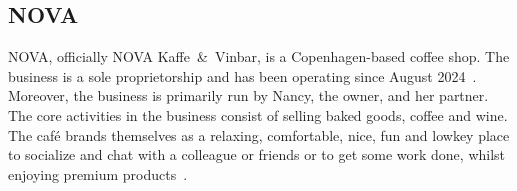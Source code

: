 \subsection{NOVA}\label{subsec:nova}

NOVA, officially NOVA Kaffe~\&~Vinbar, is a Copenhagen-based coffee shop.
The business is a sole proprietorship and has been operating since August 2024~\cite{cvr2024}.
Moreover, the business is primarily run by Nancy, the owner, and her partner.
The core activities in the business consist of selling baked goods, coffee and wine.
The café brands themselves as a relaxing, comfortable, nice, fun and lowkey place to socialize and chat with a colleague
or friends or to get some work done, whilst enjoying premium products~\cite{instagram2024}.
